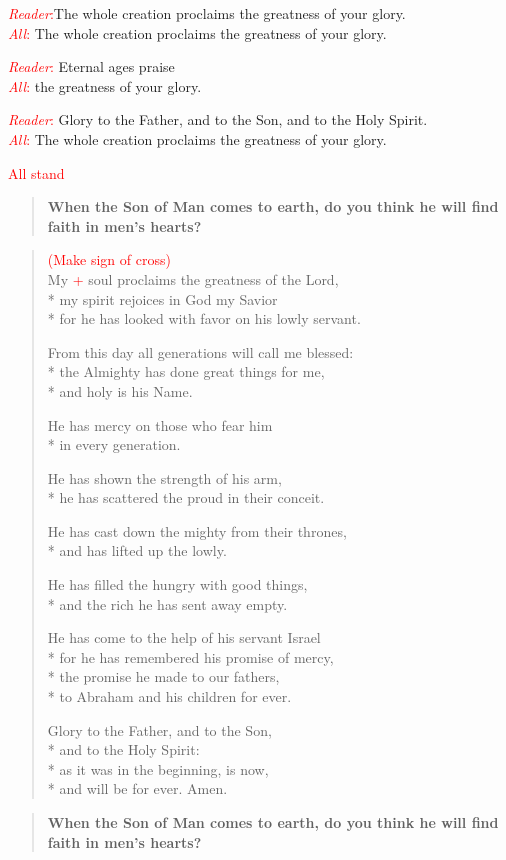 \documentclass[letterpaper,14pt]{extarticle}
\newcommand{\side}[1]{\flagverse{\textcolor{red}{\textit{#1}}:}}
\newcommand{\sidestar}[1]{\textcolor{red}{\textit{#1}:}}
\newcommand{\rednote}[1]{\textcolor{red}{#1}}
\newlength{\oldindent}
\newcommand{\antiphon}[2]{
	\setlength{\oldindent}{\vindent}
	\setlength{\vindent}{0em}
	\begin{verse}
	\side{#1} \textbf{#2}
	\end{verse}
	\setlength{\vindent}{\oldindent}
}
\begin{document}
{}
\sidestar{Reader}The whole creation proclaims the greatness of your glory.\\
\sidestar{All} The whole creation proclaims the greatness of your glory.

\sidestar{Reader} Eternal ages praise\\
\sidestar{All} the greatness of your glory.

\sidestar{Reader} Glory to the Father, and to the Son, and to the Holy Spirit. \\
\sidestar{All} The whole creation proclaims the greatness of your glory.

\rednote{All stand}
\antiphon{Leader}{When the Son of Man comes to earth, do you think he will find faith in men’s hearts?}
\setlength{\stanzaskip}{0.25\baselineskip}
\begin{verse}
\rednote{(Make sign of cross)}\\
\side{All} My \rednote{+} soul proclaims the greatness of the Lord, \\*
my spirit rejoices in God my Savior \\*
for he has looked with favor on his lowly servant.

From this day all generations will call me blessed: \\*
the Almighty has done great things for me, \\*
and holy is his Name.

He has mercy on those who fear him \\*
in every generation.

He has shown the strength of his arm, \\*
he has scattered the proud in their conceit.

He has cast down the mighty from their thrones, \\*
and has lifted up the lowly.

He has filled the hungry with good things, \\*
and the rich he has sent away empty.

He has come to the help of his servant Israel \\*
for he has remembered his promise of mercy, \\*
the promise he made to our fathers, \\*
to Abraham and his children for ever.

Glory to the Father, and to the Son, \\*
and to the Holy Spirit: \\*
as it was in the beginning, is now, \\*
and will be for ever. Amen.
\end{verse}
\setlength{\stanzaskip}{0.75\baselineskip}
\antiphon{All}{When the Son of Man comes to earth, do you think he will find faith in men’s hearts?}
\end{document}
